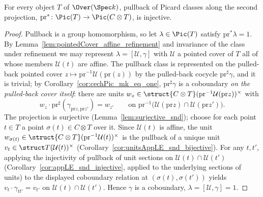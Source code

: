 \begin{theorem}
  \label{thm:prPullback_injective}
  \leanok
  For every object \(T\) of \(\Over(\Spec k)\), pullback of Picard classes along the second
  projection, \(\mathrm{pr}^{*} \colon \Pic(T) \to \Pic(C \otimes T)\), is injective.
\end{theorem}
\begin{proof}
  \leanok
  Pullback is a group homomorphism, so let \(\lambda \in \Pic(T)\) satisfy
  \(\mathrm{pr}^{*}\lambda = 1\). By Lemma~\ref{lem:pointedCover_affine_refinement} and
  invariance of the class under refinement we may represent \(\lambda = [\mathcal U, \gamma]\)
  with \(\mathcal U\) a pointed cover of \(T\) all of whose members \(\mathcal U(t)\) are
  affine. The pullback class is represented on the pulled-back pointed cover
  \(z \mapsto \mathrm{pr}^{-1}\mathcal U(\mathrm{pr}(z))\) by the pulled-back cocycle
  \(\mathrm{pr}^{\sharp}\gamma\), and it is trivial; by
  Corollary~\ref{cor:cechPic_mk_eq_one}, \(\mathrm{pr}^{\sharp}\gamma\) is a coboundary
  \emph{on the pulled-back cover itself}: there are units
  \(w_z \in \struct{C \otimes T}(\mathrm{pr}^{-1}\mathcal U(\mathrm{pr} z))^{\times}\) with
  \[ w_z \cdot \mathrm{pr}^{\sharp}(\gamma_{\mathrm{pr}z, \mathrm{pr}z'}) = w_{z'}
     \qquad\text{on } \mathrm{pr}^{-1}\bigl(\mathcal U(\mathrm{pr}z) \cap
       \mathcal U(\mathrm{pr}z')\bigr). \]
  The projection is surjective (Lemma~\ref{lem:surjective_snd}); choose for each point
  \(t \in T\) a point \(\sigma(t) \in C \otimes T\) over it. Since \(\mathcal U(t)\) is
  affine, the unit \(w_{\sigma(t)} \in
  \struct{C \otimes T}(\mathrm{pr}^{-1}\mathcal U(t))^{\times}\) is the pullback of a unique
  unit \(v_t \in \struct T(\mathcal U(t))^{\times}\)
  (Corollary~\ref{cor:unitsAppLE_snd_bijective}). For any \(t, t'\), applying the injectivity
  of pullback of unit sections on \(\mathcal U(t) \cap \mathcal U(t')\)
  (Corollary~\ref{cor:appLE_snd_injective}, applied to the underlying sections of units) to
  the displayed coboundary relation at \((\sigma(t), \sigma(t'))\) yields
  \(v_t \cdot \gamma_{t t'} = v_{t'}\) on \(\mathcal U(t) \cap \mathcal U(t')\). Hence
  \(\gamma\) is a coboundary, \(\lambda = [\mathcal U, \gamma] = 1\).
\end{proof}


